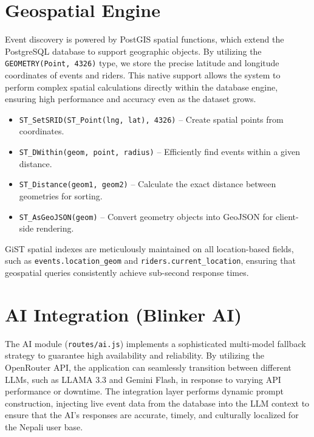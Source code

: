 
\section{Geospatial Engine}
Event discovery is powered by PostGIS spatial functions, which extend the PostgreSQL database to support geographic objects. By utilizing the \texttt{GEOMETRY(Point, 4326)} type, we store the precise latitude and longitude coordinates of events and riders. This native support allows the system to perform complex spatial calculations directly within the database engine, ensuring high performance and accuracy even as the dataset grows.

\begin{itemize}[noitemsep]
    \item \texttt{ST\_SetSRID(ST\_Point(lng, lat), 4326)} -- Create spatial points from coordinates.
    \item \texttt{ST\_DWithin(geom, point, radius)} -- Efficiently find events within a given distance.
    \item \texttt{ST\_Distance(geom1, geom2)} -- Calculate the exact distance between geometries for sorting.
    \item \texttt{ST\_AsGeoJSON(geom)} -- Convert geometry objects into GeoJSON for client-side rendering.
\end{itemize}
GiST spatial indexes are meticulously maintained on all location-based fields, \\ such as \texttt{events.location\_geom} and \texttt{riders.current\_location}, ensuring that geospatial queries consistently achieve sub-second response times.

\section{AI Integration (Blinker AI)}
The AI module (\texttt{routes/ai.js}) implements a sophisticated multi-model fallback strategy to guarantee high availability and reliability. By utilizing the OpenRouter API, the application can seamlessly transition between different LLMs, such as LLAMA 3.3 and Gemini Flash, in response to varying API performance or downtime. The integration layer performs dynamic prompt construction, injecting live event data from the database into the LLM context to ensure that the AI's responses are accurate, timely, and culturally localized for the Nepali user base.

